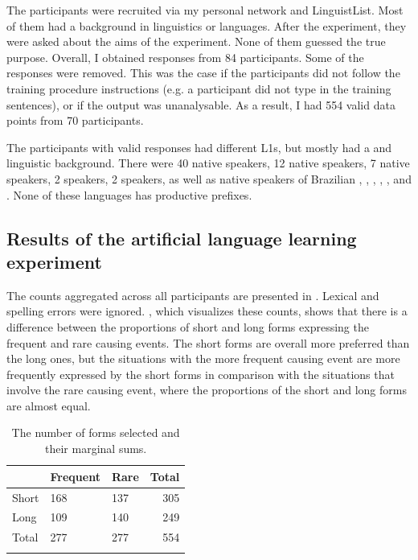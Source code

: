 \documentclass[output=paper]{langsci/langscibook}
\begin{document}
The participants were recruited via my personal network and LinguistList. Most of them had a background in linguistics or languages. After the experiment, they were asked about the aims of the experiment. None of them guessed the true purpose. Overall, I obtained responses from 84 participants. Some of the responses were removed. This was the case if the participants did not follow the training procedure instructions (e.g. a participant did not type in the training sentences), or if the output was unanalysable. As a result, I had 554 valid data points from 70 participants. 

The participants with valid responses had different L1s, but mostly had a  and  linguistic background. There were 40 native  speakers, 12 native  speakers, 7 native  speakers, 2  speakers, 2  speakers, as well as native speakers of Brazilian , , , , ,  and . None of these languages has productive  prefixes.

\subsection{Results of the artificial language learning experiment}

The counts aggregated across all participants are presented in . Lexical and spelling errors were ignored. , which visualizes these counts, shows that there is a difference between the proportions of short and long forms expressing the frequent and rare causing events. The short forms are overall more preferred than the long ones, but the situations with the more frequent causing event are more frequently expressed by the short forms in comparison with the situations that involve the rare causing event, where the proportions of the short and long forms are almost equal.

\begin{table}
\begin{tabularx}{.8\textwidth}{XYY@{\qquad\qquad}r} 
\lsptoprule
& Frequent & Rare &  {Total}\\
\midrule
Short & 168 & 137 &  {305}\\
Long & 109 & 140 &  {249}\\
\midrule 
 {Total} &  {277} &  {277} &  {554}\\
\lspbottomrule
\end{tabularx} 
\caption{The number of forms selected and their marginal sums.}
\label{tab:levshina:1}
\end{table}
\end{document}
